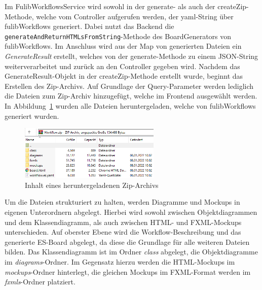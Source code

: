 Im FulibWorkflowsService wird sowohl in der generate- als auch der createZip-Methode, welche vom Controller aufgerufen werden,
der yaml-String über fulibWorkflows generiert.
Dabei nutzt das Backend die \texttt{generateAndReturnHTMLsFromString}-Methode des BoardGenerators von fulibWorkflows.
Im Anschluss wird aus der Map von generierten Dateien ein \textit{GenerateResult} erstellt, welches von der generate-Methode zu einem JSON-String weiterverarbeitet und zurück an den Controller gegeben wird.
Nachdem das GenerateResult-Objekt in der createZip-Methode erstellt wurde, beginnt das Erstellen des Zip-Archivs.
Auf Grundlage der Query-Parameter werden lediglich die Dateien zum Zip-Archiv hinzugefügt, welche im Frontend ausgewählt werden.
In Abbildung~\ref{fig:export} wurden alle Dateien heruntergeladen, welche von fulibWorkflows generiert wurden.

\begin{figure}[h]
    \centering
    \includegraphics[width=0.6\textwidth]{images/3.3/export}
    \caption{Inhalt eines heruntergeladenen Zip-Archivs}
    \label{fig:export}
\end{figure}

Um die Dateien strukturiert zu halten, werden Diagramme und Mockups in eigenen Unterordnern abgelegt.
Hierbei wird sowohl zwischen Objektdiagrammen und dem Klassendiagramm, als auch zwischen HTML- und FXML-Mockups unterschieden.
Auf oberster Ebene wird die Workflow-Beschreibung und das generierte \ac{ES}-Board abgelegt, da diese
die Grundlage für alle weiteren Dateien bilden.
Das Klassendiagramm ist im Ordner \textit{class} abgelegt, die Objektdiagramme im \textit{diagrams}-Ordner.
Im Gegensatz hierzu werden die HTML-Mockups im \textit{mockups}-Ordner hinterlegt, die gleichen Mockups im FXML-Format werden
im \textit{fxmls}-Ordner platziert.
